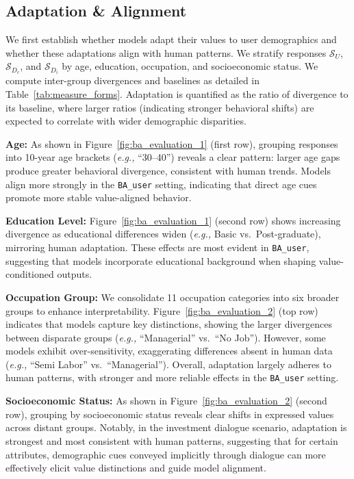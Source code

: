 \documentclass[11pt,a4paper]{article}
\newcommand{\paratitle}[1]{\smallskip\noindent\textbf{#1}}
\newcommand{\eg}{\textit{e.g.,} \xspace}
\begin{document}
\subsection{Adaptation \& Alignment}

We first establish whether models adapt their values to user demographics and whether these adaptations align with human patterns. We stratify responses $\mathcal{S}_U$, $\mathcal{S}_{D_c}$, and $\mathcal{S}_{D_i}$ by age, education, occupation, and socioeconomic status. We compute inter-group divergences and baselines as detailed in Table~\ref{tab:measure_forms}. Adaptation is quantified as the ratio of divergence to its baseline, where larger ratios (indicating stronger behavioral shifts) are expected to correlate with wider demographic disparities.


\paratitle{Age:} As shown in Figure~\ref{fig:ba_evaluation_1} (first row), grouping responses into 10-year age brackets (\eg ``30--40'') reveals a clear pattern: larger age gaps produce greater behavioral divergence, consistent with human trends. Models align more strongly in the \texttt{BA\_user} setting, indicating that direct age cues promote more stable value-aligned behavior.

\paratitle{Education Level:} Figure~\ref{fig:ba_evaluation_1} (second row) shows increasing divergence as educational differences widen (\eg Basic vs.\ Post-graduate), mirroring human adaptation. These effects are most evident in \texttt{BA\_user}, suggesting that models incorporate educational background when shaping value-conditioned outputs.


\paratitle{Occupation Group:} We consolidate 11 occupation categories into six broader groups to enhance interpretability. Figure~\ref{fig:ba_evaluation_2} (top row) indicates that models capture key distinctions, showing the larger divergences between disparate groups (\eg ``Managerial'' vs.\ ``No Job''). However, some models exhibit over-sensitivity, exaggerating differences absent in human data (\eg ``Semi Labor'' vs.\ ``Managerial''). Overall, adaptation largely adheres to human patterns, with stronger and more reliable effects in the \texttt{BA\_user} setting.

\paratitle{Socioeconomic Status:} As shown in Figure~\ref{fig:ba_evaluation_2} (second row), grouping by socioeconomic status reveals clear shifts in expressed values across distant groups. Notably, in the investment dialogue scenario, adaptation is strongest and most consistent with human patterns, suggesting that for certain attributes, demographic cues conveyed implicitly through dialogue can more effectively elicit value distinctions and guide model alignment.
\end{document}
